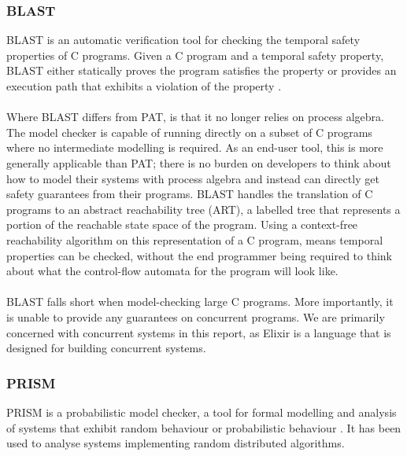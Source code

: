 \subsubsection*{\textbf{BLAST}}
BLAST is an automatic verification tool for checking the temporal safety properties of C programs. Given a C program and a temporal safety property, BLAST either statically proves the program satisfies the property or provides an execution path that exhibits a violation of the property \cite{blast}.
\\ \\
Where BLAST differs from PAT, is that it no longer relies on process algebra. The model checker is capable of running directly on a subset of C programs where no intermediate modelling is required. As an end-user tool, this is more generally applicable than PAT; there is no burden on developers to think about how to model their systems with process algebra and instead can directly get safety guarantees from their programs. BLAST handles the translation of C programs to an abstract reachability tree (ART), a labelled tree that represents a portion of the reachable state space of the program. Using a context-free reachability algorithm on this representation of a C program, means temporal properties can be checked, without the end programmer being required to think about what the control-flow automata for the program will look like.
\\ \\
BLAST falls short when model-checking large C programs. More importantly, it is unable to provide any guarantees on concurrent programs. We are primarily concerned with concurrent systems in this report, as Elixir is a language that is designed for building concurrent systems.

\subsubsection*{\textbf{PRISM}}
PRISM is a probabilistic model checker, a tool for formal modelling and analysis of systems that exhibit random behaviour or probabilistic behaviour \cite{prism}. It has been used to analyse systems implementing random distributed algorithms.

